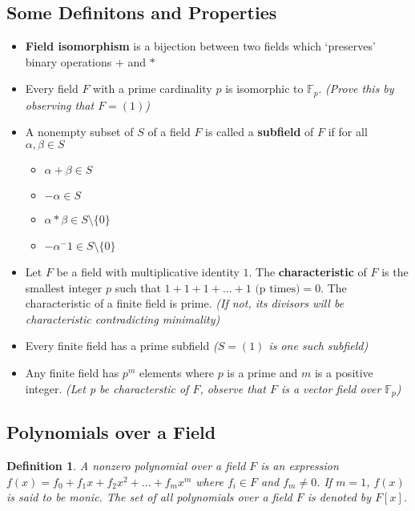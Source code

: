 \documentclass[a4paper]{article}
\theoremstyle{dotless}
\theoremstyle{dotless}
\newtheorem{defn}{Definition}[section]
\theoremstyle{remark}
\begin{document}
\subsection{Some Definitons and Properties}
\begin{itemize}
\item \textbf{Field isomorphism} is a bijection between two fields which `preserves' binary operations $+$ and $*$
\item Every field $F$ with a prime cardinality $p$ is isomorphic to $\mathbb{F}_p$. \textsl{(Prove this by observing that $F = (1)$)}
\item A nonempty subset of $S$ of a field $F$ is called a \textbf{subfield} of $F$ if for all $\alpha, \beta \in S$
		\begin{itemize}
		\item $\alpha + \beta \in S$
		\item $-\alpha \in S$
		\item $\alpha * \beta \in S\setminus\{0\}$
		\item $-\alpha^-1 \in S\setminus\{0\}$
		\end{itemize}

\item Let $F$ be a field with multiplicative identity $1$. The \textbf{characteristic} of $F$ is the smallest integer $p$ such that $1+1+1+\dots+1 \text{ (p times)} = 0$. The characteristic of a finite field is prime. \textsl{(If not, its divisors will be characteristic contradicting minimality)}
\item Every finite field has a prime subfield \textsl{($S = (1)$ is one such subfield)}
\item Any finite field has $p^m$ elements where $p$ is a prime and $m$ is a positive integer.
\textsl{(Let p be characterstic of $F$, observe that $F$ is a vector field over $\mathbb{F}_p$)}
\end{itemize}

\subsection{Polynomials over a Field}
\begin{defn}
A nonzero polynomial over a field $F$ is an expression $f (x ) = f_0 + f_1 x + f_2 x^2 +\dots + f_m x^m$ where $f_i \in F$ and $f_m \not= 0$. If $m =1$, $f(x)$ is said to be monic. 
The set of all polynomials over a field $F$ is denoted by $F[x]$.
\end{defn}
\end{document}
